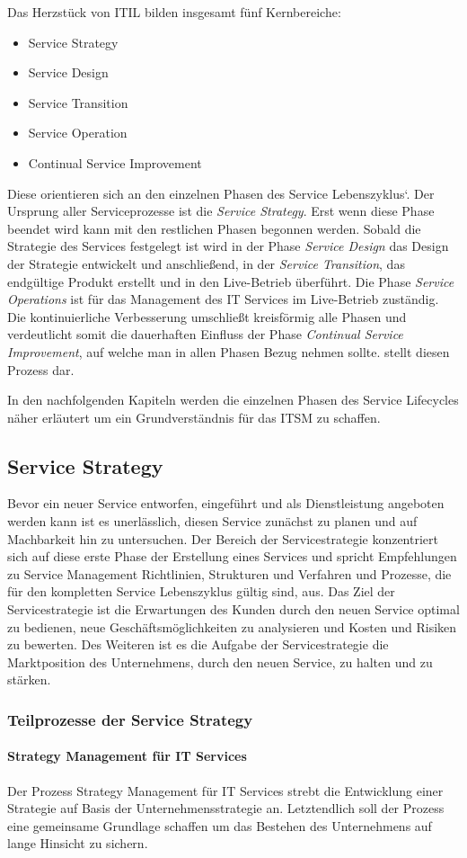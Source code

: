 Das Herzstück von \ac{ITIL} bilden insgesamt fünf Kernbereiche:
\begin{itemize}
	\item Service Strategy
	\item Service Design
	\item Service Transition
	\item Service Operation
	\item Continual Service Improvement
\end{itemize}
Diese orientieren sich an den einzelnen Phasen des Service Lebenszyklus`. Der Ursprung aller Serviceprozesse ist die \textit{Service Strategy}. Erst wenn diese Phase beendet wird kann mit den restlichen Phasen begonnen werden.
Sobald die Strategie des Services festgelegt ist wird in der Phase \textit{Service Design} das Design der Strategie entwickelt und anschließend, in der \textit{Service Transition}, das endgültige Produkt erstellt und in den Live-Betrieb überführt.
Die Phase \textit{Service Operations} ist für das Management des IT Services im Live-Betrieb zuständig.
Die kontinuierliche Verbesserung umschließt kreisförmig alle Phasen und verdeutlicht somit die dauerhaften Einfluss der Phase \textit{Continual Service Improvement}, auf welche man in allen Phasen Bezug nehmen sollte.
 stellt diesen Prozess dar.



In den nachfolgenden Kapiteln werden die einzelnen Phasen des Service Lifecycles näher erläutert um ein Grundverständnis für das \ac{ITSM} zu schaffen.
\newpage
\subsection{Service Strategy}
Bevor ein neuer Service entworfen, eingeführt und als Dienstleistung angeboten werden kann ist es unerlässlich, diesen Service zunächst zu planen und auf Machbarkeit hin zu untersuchen.
Der Bereich der Servicestrategie konzentriert sich auf diese erste Phase der Erstellung eines Services und spricht Empfehlungen zu Service Management Richtlinien, Strukturen und Verfahren und Prozesse, die für den kompletten Service Lebenszyklus gültig sind, aus.
Das Ziel der Servicestrategie ist die Erwartungen des Kunden durch den neuen Service optimal zu bedienen, neue Geschäftsmöglichkeiten zu analysieren und Kosten und Risiken zu bewerten.
Des Weiteren ist es die Aufgabe der Servicestrategie die Marktposition des Unternehmens, durch den neuen Service, zu halten und zu stärken.
\subsubsection{Teilprozesse der Service Strategy}
\paragraph{Strategy Management für IT Services}
Der Prozess Strategy Management für IT Services strebt die Entwicklung einer Strategie auf Basis der Unternehmensstrategie an.
Letztendlich soll der Prozess eine gemeinsame Grundlage schaffen um das Bestehen des Unternehmens auf lange Hinsicht zu sichern.

